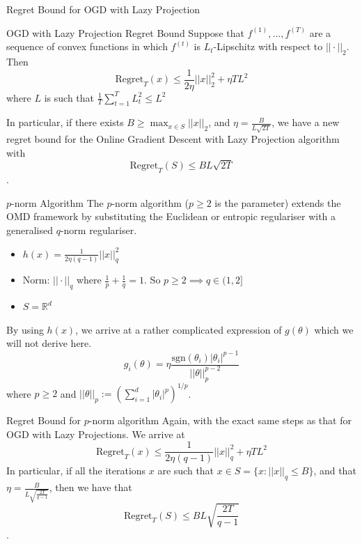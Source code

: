 \begin{frame}{Regret Bound for OGD with Lazy Projection}
    \begin{block}{OGD with Lazy Projection Regret Bound}
    Suppose that $f^{(1)}, \ldots, f^{(T)}$ are a sequence of convex functions in which $f^{(t)}$ is $L_t$-Lipschitz with respect to $||\cdot||_2$. Then
    \begin{equation*}
        \text{Regret}_T(x) \leq \frac{1}{2\eta}||x||_2^2 + \eta TL^2
    \end{equation*}
    where $L$ is such that $\frac{1}{T}\sum_{t=1}^TL_t^2 \leq L^2$
\end{block}
\pause
In particular, if there exists $B \geq \max_{x \in S}||x||_2$, and $\eta = \frac{B}{L\sqrt{2T}}$, we have a new regret bound for the Online Gradient Descent with Lazy Projection algorithm with 
$$\text{Regret}_T(S) \leq BL \sqrt{2T}$$.
\end{frame}

\begin{frame}{$p$-norm Algorithm}
The $p$-norm algorithm ($p \geq 2$ is the parameter) extends the OMD framework by substituting the Euclidean or entropic regulariser with a generalised $q$-norm regulariser.
\begin{itemize}
    \item $h(x) = \frac{1}{2\eta (q - 1)}||x||_q^2$
    \item Norm: $||\cdot||_q$ where $\frac{1}{p} + \frac{1}{q} = 1$. So $p \geq 2 \implies q \in (1, 2]$ 
    \item $S = \mathbb R^d$
\end{itemize}\pause
By using $h(x)$, we arrive at a rather complicated expression of $g(\theta)$ which we will not derive here.
\begin{equation}\label{eqn:p_norm_g}
    g_i(\theta) = \eta \frac{\text{sgn}(\theta_i)  |\theta_i|^{p-1}}{||\theta||_p^{p-2}}
\end{equation} where $p \geq 2$ and $||\theta||_p := \left(\sum_{i=1}^d |\theta_i|^p\right)^{1/p}$. 
\end{frame}

\begin{frame}{Regret Bound for $p$-norm algorithm}
    Again, with the exact same steps as that for OGD with Lazy Projections. We arrive at \begin{equation}
    \boxed{\text{Regret}_T(x) \leq \frac{1}{2\eta (q - 1)}||x||_q^2 + \eta TL^2} 
\end{equation}
In particular, if all the iterations $x$ are such that $x \in S = \{x : ||x||_q \leq B\}$, and that $\eta = \frac{B}{L\sqrt{\frac{2T}{q-1}}}$, then we have that $$\text{Regret}_T(S) \leq BL\sqrt{\frac{2T}{q-1}}$$.
\end{frame}

